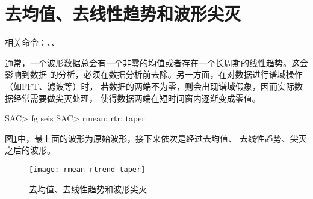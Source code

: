 \section{去均值、去线性趋势和波形尖灭}
相关命令：、、

通常，一个波形数据总会有一个非零的均值或者存在一个长周期的线性趋势。这会影响到数据
的分析，必须在数据分析前去除。另一方面，在对数据进行谱域操作（如FFT、滤波等）时，
若数据的两端不为零，则会出现谱域假象，因而实际数据经常需要做尖灭处理，
使得数据两端在短时间窗内逐渐变成零值。
\begin{SACCode}
SAC> fg seis
SAC> rmean; rtr; taper
\end{SACCode}

图\ref{fig:rmean-rtrend-taper}中，最上面的波形为原始波形，接下来依次是经过去均值、
去线性趋势、尖灭之后的波形。

\begin{figure}[H]
\centering
\texttt{[image: rmean-rtrend-taper]}
\caption{去均值、去线性趋势和波形尖灭}
\label{fig:rmean-rtrend-taper}
\end{figure}
